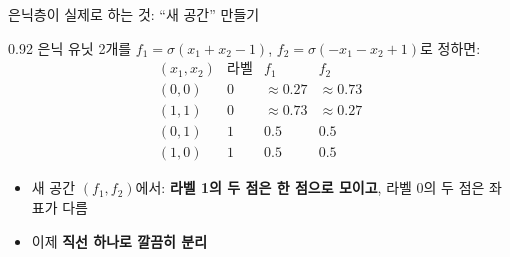 \begin{frame}{은닉층이 실제로 하는 것: ``새 공간'' 만들기}
\begin{center}\begin{varwidth}{0.92\textwidth}
  \small
  은닉 유닛 2개를 $f_1 = \sigma(x_1 + x_2 - 1)$, $f_2 = \sigma(-x_1 - x_2 + 1)$로 정하면:
  \[
  \begin{array}{c|c|cc}
  (x_1,x_2) & \text{라벨} & f_1 & f_2 \\ \hline
  (0,0) & 0 & \approx 0.27 & \approx 0.73 \\
  (1,1) & 0 & \approx 0.73 & \approx 0.27 \\
  (0,1) & 1 & 0.5 & 0.5 \\
  (1,0) & 1 & 0.5 & 0.5
  \end{array}
  \]
  \begin{itemize}
    \item 새 공간 $(f_1, f_2)$에서: \textbf{라벨 1의 두 점은 한 점으로 모이고},
      라벨 0의 두 점은 좌표가 다름
    \item 이제 \textbf{직선 하나로 깔끔히 분리}
  \end{itemize}
\end{varwidth}\end{center}
\end{frame}
